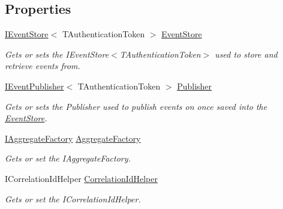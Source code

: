 \subsection*{Properties}
\begin{DoxyCompactItemize}
\item 
\hyperlink{interfaceCqrs_1_1Events_1_1IEventStore}{I\+Event\+Store}$<$ T\+Authentication\+Token $>$ \hyperlink{classCqrs_1_1Domain_1_1AggregateRepository_a99c8546ada9058c0488727b01c626528_a99c8546ada9058c0488727b01c626528}{Event\+Store}
\begin{DoxyCompactList}\small\item\em Gets or sets the I\+Event\+Store$<$\+T\+Authentication\+Token$>$ used to store and retrieve events from. \end{DoxyCompactList}\item 
\hyperlink{interfaceCqrs_1_1Events_1_1IEventPublisher}{I\+Event\+Publisher}$<$ T\+Authentication\+Token $>$ \hyperlink{classCqrs_1_1Domain_1_1AggregateRepository_a6388abb96d4480c6141f5d5e469a2ca0_a6388abb96d4480c6141f5d5e469a2ca0}{Publisher}
\begin{DoxyCompactList}\small\item\em Gets or sets the Publisher used to publish events on once saved into the \hyperlink{namespaceCqrs_1_1EventStore}{Event\+Store}. \end{DoxyCompactList}\item 
\hyperlink{interfaceCqrs_1_1Domain_1_1Factories_1_1IAggregateFactory}{I\+Aggregate\+Factory} \hyperlink{classCqrs_1_1Domain_1_1AggregateRepository_a9c2ffdf87ba242cf0c540f4b0d020777_a9c2ffdf87ba242cf0c540f4b0d020777}{Aggregate\+Factory}
\begin{DoxyCompactList}\small\item\em Gets or set the I\+Aggregate\+Factory. \end{DoxyCompactList}\item 
I\+Correlation\+Id\+Helper \hyperlink{classCqrs_1_1Domain_1_1AggregateRepository_a758d2fd5c0cf30bc038a996800421fd0_a758d2fd5c0cf30bc038a996800421fd0}{Correlation\+Id\+Helper}
\begin{DoxyCompactList}\small\item\em Gets or set the I\+Correlation\+Id\+Helper. \end{DoxyCompactList}\item 

\end{DoxyCompactItemize}
